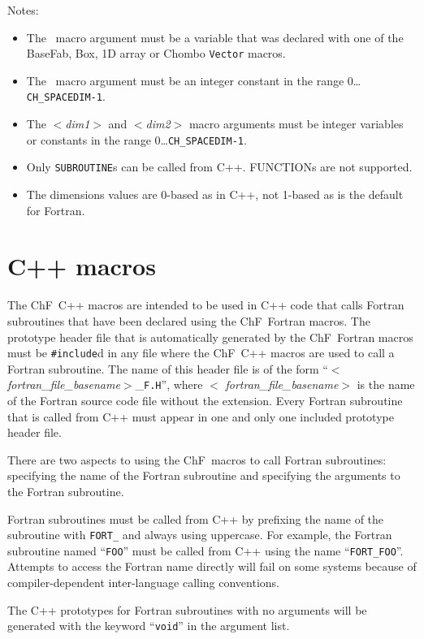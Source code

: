 \noindent Notes:
\begin{itemize}
\item The \argv\ macro argument must be a variable that was declared with
one of the BaseFab, Box, 1D array or Chombo {\tt Vector} macros.
\item The \dimv\ macro argument must be an integer constant
in the
range 0\ldots{\tt CH\_SPACEDIM-1}.
\item The $<${\em dim1}$>$ and $<${\em dim2}$>$
macro arguments must be integer variables or constants in the
range 0\ldots{\tt CH\_SPACEDIM-1}.
\item Only {\tt SUBROUTINE}s 
can be called from C++.  {FUNCTION}s are not supported.
\item The dimensions values are 0-based as in C++, not 1-based 
as is the default for Fortran.
\end{itemize}

\section{C++ macros}

The ChF\ C++ macros are intended to be used in C++ code that calls Fortran
subroutines that have been declared using the ChF\ Fortran macros.  The
prototype header file that is automatically generated by the ChF\ Fortran
macros must be {\tt \#include}d in any file where the ChF\ C++ macros are 
used to call a Fortran subroutine.  The name of this header file is of the form
``$<${\em fortran\_file\_basename}$>$\_{\tt F.H}'', where $<${\em
fortran\_file\_basename}$>$ is the name of the Fortran source code file without
the extension.  Every Fortran subroutine that is called from C++ must appear in
one and only one included prototype header file.

There are two aspects to using the ChF\ macros to call Fortran subroutines:
specifying the name of the Fortran subroutine and specifying the arguments to
the Fortran subroutine.

Fortran subroutines must be called from C++ by prefixing the name of the
subroutine with {\tt FORT\_} and always using uppercase.  For example, the
Fortran subroutine named ``{\tt FOO}'' must be called from C++ using the
name ``{\tt FORT\_FOO}''.  Attempts to access the Fortran name directly will 
fail on some systems because of compiler-dependent inter-language calling
conventions.  

The C++ prototypes for Fortran subroutines with no arguments will 
be generated with the keyword ``{\tt void}'' in the argument list.

